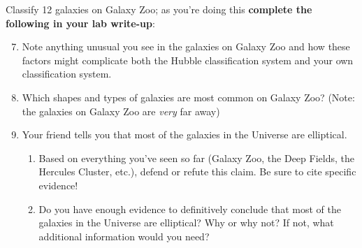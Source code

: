 \documentclass[11pt]{article}
\begin{document}
\medskip \noindent
Classify 12 galaxies on Galaxy Zoo; as you're doing this \textbf{complete the following in your lab write-up}:
\begin{enumerate}
\setcounter{enumi}{6}
    
    \item Note anything unusual you see in the galaxies on Galaxy Zoo and how these factors might complicate both the Hubble classification system and your own classification system.

    \item Which shapes and types of galaxies are most common on Galaxy Zoo? (Note: the galaxies on Galaxy Zoo are \emph{very} far away)

    \item Your friend tells you that most of the galaxies in the Universe are elliptical.
    \begin{enumerate}
        \item Based on everything you've seen so far (Galaxy Zoo, the Deep Fields, the Hercules Cluster, etc.), defend or refute this claim. Be sure to cite specific evidence!
        \item Do you have enough evidence to definitively conclude that most of the galaxies in the Universe are elliptical? Why or why not? If not, what additional information would you need?
    \end{enumerate}
\end{enumerate}
\end{document}
